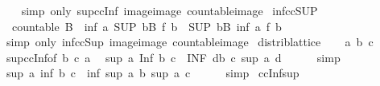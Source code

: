 \begin{isabellebody}
%
\isadelimproof
\ \ %
\endisadelimproof
%
\isatagproof
{}\isamarkupfalse%
\ {\isacharparenleft}simp\ only{\isacharcolon}\ sup{\isacharunderscore}ccInf\ image{\isacharunderscore}image\ countable{\isacharunderscore}image{\isacharparenright}%
\endisatagproof
{\isafoldproof}%
%
\isadelimproof
\isanewline
%
\endisadelimproof
\isanewline
{}\isamarkupfalse%
\ inf{\isacharunderscore}ccSUP{\isacharcolon}\isanewline
\ \ {\isachardoublequoteopen}countable\ B\ {\isasymLongrightarrow}\ inf\ a\ {\isacharparenleft}SUP\ b{\isasymin}B{\isachardot}\ f\ b{\isacharparenright}\ {\isacharequal}\ {\isacharparenleft}SUP\ b{\isasymin}B{\isachardot}\ inf\ a\ {\isacharparenleft}f\ b{\isacharparenright}{\isacharparenright}{\isachardoublequoteclose}\isanewline
%
\isadelimproof
\ \ %
\endisadelimproof
%
\isatagproof
{}\isamarkupfalse%
\ {\isacharparenleft}simp\ only{\isacharcolon}\ inf{\isacharunderscore}ccSup\ image{\isacharunderscore}image\ countable{\isacharunderscore}image{\isacharparenright}%
\endisatagproof
{\isafoldproof}%
%
\isadelimproof
\isanewline
%
\endisadelimproof
\isanewline
{}\isamarkupfalse%
\ distrib{\isacharunderscore}lattice\isanewline
%
\isadelimproof
%
\endisadelimproof
%
\isatagproof
{}\isamarkupfalse%
\isanewline
\ \ \isamarkupfalse%
\ a\ b\ c\isanewline
\ \ \isamarkupfalse%
\ sup{\isacharunderscore}ccInf{\isacharbrackleft}of\ {\isachardoublequoteopen}{\isacharbraceleft}b{\isacharcomma}\ c{\isacharbraceright}{\isachardoublequoteclose}\ a{\isacharbrackright}\ \isamarkupfalse%
\ {\isachardoublequoteopen}sup\ a\ {\isacharparenleft}Inf\ {\isacharbraceleft}b{\isacharcomma}\ c{\isacharbraceright}{\isacharparenright}\ {\isacharequal}\ {\isacharparenleft}INF\ d{\isasymin}{\isacharbraceleft}b{\isacharcomma}\ c{\isacharbraceright}{\isachardot}\ sup\ a\ d{\isacharparenright}{\isachardoublequoteclose}\isanewline
\ \ \ \ \isamarkupfalse%
\ simp\isanewline
\ \ \isamarkupfalse%
\ \isamarkupfalse%
\ {\isachardoublequoteopen}sup\ a\ {\isacharparenleft}inf\ b\ c{\isacharparenright}\ {\isacharequal}\ inf\ {\isacharparenleft}sup\ a\ b{\isacharparenright}\ {\isacharparenleft}sup\ a\ c{\isacharparenright}{\isachardoublequoteclose}\isanewline
\ \ \ \ \isamarkupfalse%
\ simp\isanewline
{}\isamarkupfalse%
%
\endisatagproof
{\isafoldproof}%
%
\isadelimproof
\isanewline
%
\endisadelimproof
\isanewline
{}\isamarkupfalse%
\ ccInf{\isacharunderscore}sup{\isacharcolon}\isanewline

\end{isabellebody}
